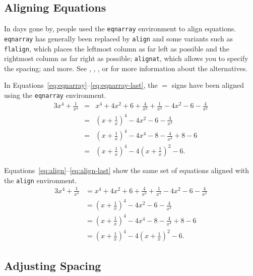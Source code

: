 \documentclass{icmmcm}
\newcommand{\env}[1]{\texttt{#1}\xspace}
\begin{document}
{\subsection{Aligning Equations}%
\label{sec:aligning-equations}

In days gone by, people used the \env{eqnarray} environment to align
equations.  \env{eqnarray} has generally been replaced by \env{align}
and some variants such as \env{flalign}, which places the leftmost
column as far left as possible and the rightmost column as far right
as possible; \env{alignat}, which allows you to specify the spacing;
and more.  See \cite{amsmath-doc}, \cite{gratzer-mil}, \cite{lamport},
or \cite{kopka-daly-guide} for more information about the
alternatives.

In Equations~\ref{eq:eqnarray}--\ref{eq:eqnarray-last}, the $=$ signs
have been aligned using the \env{eqnarray} environment.
\begin{eqnarray}{3}%
\label{eq:eqnarray}
   x^4 + \frac{1}{x^4} & = & x^4 + 4 x^2 + 6 + \frac{4}{x^2} + \frac{1}{x^4} -
   4 x^2 - 6 - \frac{4}{x^2}\\
   & = & \left( x + \frac{1}{x} \right)^4 - 4 x^2 - 6 - \frac{4}{x^4}\\
   & = & \left( x + \frac{1}{x} \right)^4 - 4 x^4 - 8 - \frac{4}{x^4} + 8 - 6\\
   & = & \left( x + \frac{1}{x} \right)^4 - 4 \left( x + \frac{1}{x} \right)^2
   - 6.%
\label{eq:eqnarray-last}
\end{eqnarray}

Equations~\ref{eq:align}--\ref{eq:align-last} show the same set
of equations aligned with the \env{align} environment.
\begin{align}{3}%
\label{eq:align}
   x^4 + \frac{1}{x^4} &= x^4 + 4 x^2 + 6 + \frac{4}{x^2} + \frac{1}{x^4} -
   4 x^2 - 6 - \frac{4}{x^2}\\
   &=  \left( x + \frac{1}{x} \right)^4 - 4 x^2 - 6 - \frac{4}{x^4}\\
   &=  \left( x + \frac{1}{x} \right)^4 - 4 x^4 - 8 - \frac{4}{x^4} + 8 - 6\\
   &=  \left( x + \frac{1}{x} \right)^4 - 4 \left( x + \frac{1}{x} \right)^2
   - 6.%
\label{eq:align-last}
\end{align}

\subsection{Adjusting Spacing}%
\label{sec:math-spacing}

}
\end{document}
